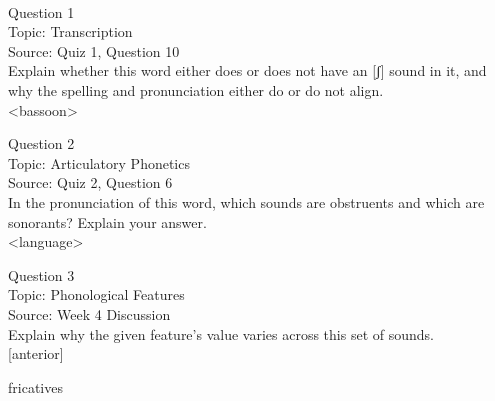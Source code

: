 \documentclass[12pt]{article}
\begin{document}
\newpage

\begin{center}
\textbf{{\color{red}{\HUGE END OF EXAM}}}\\

\end{center}
\newpage

\begin{center}
\textbf{{\color{blue}{\HUGE START OF EXAM\\}}}

\textbf{{\color{blue}{\HUGE Student ID: 11196\\}}}

\textbf{{\color{blue}{\HUGE \\}}}

\end{center}
\newpage

{\large Question 1}\\

Topic: Transcription\\
Source: Quiz 1, Question 10\\

Explain whether this word either does or does not have an [ʃ] sound in it, and why the spelling and pronunciation either do or do not align.\\

<bassoon>


\newpage

{\large Question 2}\\

Topic: Articulatory Phonetics\\
Source: Quiz 2, Question 6\\

In the pronunciation of this word, which sounds are obstruents and which are sonorants? Explain your answer.\\

<language>


\newpage

{\large Question 3}\\

Topic: Phonological Features\\
Source: Week 4 Discussion\\

Explain why the given feature's value varies across this set of sounds.\\

{[anterior]}

fricatives


\newpage
\end{document}
